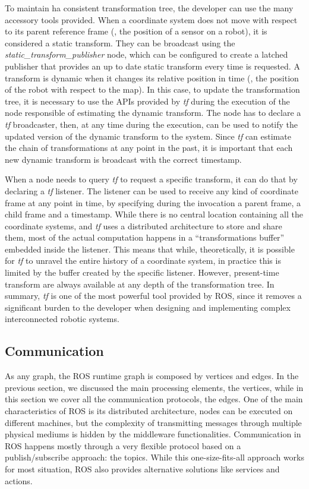 To maintain ha consistent transformation tree, the developer can use the many accessory tools provided. When a coordinate system does not move with respect to its parent reference frame (\eg, the position of a sensor on a robot), it is considered a static transform. They can be broadcast using the \textit{static\_transform\_publisher} node, which can be configured to create a latched publisher that provides an up to date static transform every time is requested. A transform is dynamic when it changes its relative position in time (\eg, the position of the robot with respect to the map). In this case, to update the transformation tree, it is necessary to use the APIs provided by \textit{tf} during the execution of the node responsible of estimating the dynamic transform. The node has to declare a \textit{tf} broadcaster, then, at any time during the execution, can be used to notify the updated version of the dynamic transform to the system.  Since \textit{tf} can estimate the chain of transformations at any point in the past, it is important that each new dynamic transform is broadcast with the correct timestamp.

When a node needs to query \textit{tf} to request a specific transform, it can do that by declaring a \textit{tf} listener. The listener can be used to receive any kind of coordinate frame at any point in time, by specifying during the invocation a parent frame, a child frame and a timestamp. While there is no central location containing all the coordinate systems, and \textit{tf} uses a distributed architecture to store and share them, most of the actual computation happens in a ``transformations buffer'' embedded inside the listener. This means that while, theoretically, it is possible for \textit{tf} to unravel the entire history of a coordinate system, in practice this is limited by the buffer created by the specific listener. However, present-time transform are always available at any depth of the transformation tree. In summary, \textit{tf} is one of the most powerful tool provided by ROS, since it removes a significant burden to the developer when designing and implementing complex interconnected robotic systems.


\subsection{Communication}
As any graph, the ROS runtime graph is composed by vertices and edges. In the previous section, we discussed the main processing elements, the vertices, while in this section we cover all the communication protocols, the edges. One of the main characteristics of ROS is its distributed architecture, nodes can be executed on different machines, but the complexity of transmitting messages through multiple physical mediums is hidden by the middleware functionalities. Communication in ROS happens mostly through a very flexible protocol based on a publish/subscribe approach: the topics. While this one-size-fits-all approach works for most situation, ROS also provides alternative solutions like services and actions.

